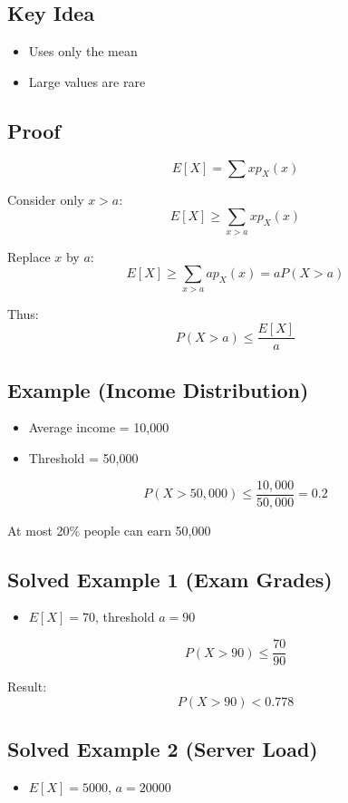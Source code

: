 \documentclass[11pt]{article}
\begin{document}
\subsection{Key Idea}
\begin{itemize}
\item Uses only the mean
\item Large values are rare
\end{itemize}

\subsection{Proof}
\[
E[X] = \sum x p_X(x)
\]

Consider only $x > a$:
\[
E[X] \geq \sum_{x>a} x p_X(x)
\]

Replace $x$ by $a$:
\[
E[X] \geq \sum_{x>a} a p_X(x) = a P(X > a)
\]

Thus:
\[
P(X > a) \leq \frac{E[X]}{a}
\]

\subsection{Example (Income Distribution)}
\begin{itemize}
\item Average income = 10,000
\item Threshold = 50,000
\end{itemize}

\[
P(X > 50,000) \leq \frac{10,000}{50,000} = 0.2
\]

At most 20\% people can earn 50,000

\subsection{Solved Example 1 (Exam Grades)}
\begin{itemize}
\item $E[X] = 70$, threshold $a = 90$
\end{itemize}

\[
P(X > 90) \leq \frac{70}{90}
\]

Result:
\[
P(X > 90) < 0.778
\]

\subsection{Solved Example 2 (Server Load)}
\begin{itemize}
\item $E[X] = 5000$, $a = 20000$
\end{itemize}
\end{document}
